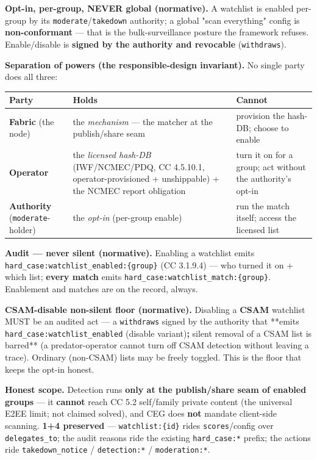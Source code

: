 \documentclass[11pt]{article}
\begin{document}
\textbf{Opt-in, per-group, NEVER global (normative).} A watchlist is enabled per-group by its \texttt{moderate}/\texttt{takedown} authority; a global "scan everything" config is \textbf{non-conformant} — that is the bulk-surveillance posture the framework refuses. Enable/disable is \textbf{signed by the authority and revocable} (\texttt{withdraws}).


\textbf{Separation of powers (the responsible-design invariant).} No single party does all three:


{\footnotesize
\begin{longtable}{|p{5.33cm}|p{5.33cm}|p{5.33cm}|}\hline
\textbf{Party} & \textbf{Holds} & \textbf{Cannot} \\ \hline\endhead
\textbf{Fabric} (the node) & the \textit{mechanism} — the matcher at the publish/share seam & provision the hash-DB; choose to enable \\ \hline
\textbf{Operator} & the \textit{licensed hash-DB} (IWF/NCMEC/PDQ, CC 4.5.10.1, operator-provisioned + unshippable) + the NCMEC report obligation & turn it on for a group; act without the authority's opt-in \\ \hline
\textbf{Authority} (\texttt{moderate}-holder) & the \textit{opt-in} (per-group enable) & run the match itself; access the licensed list \\ \hline
\end{longtable}}


\textbf{Audit — never silent (normative).} Enabling a watchlist emits \texttt{hard\_case:watchlist\_enabled:\{group\}} (CC 3.1.9.4) — who turned it on + which list; \textbf{every match} emits \texttt{hard\_case:watchlist\_match:\{group\}}. Enablement and matches are on the record, always.


\textbf{CSAM-disable non-silent floor (normative).} Disabling a \textbf{CSAM} watchlist MUST be an audited act — a \texttt{withdraws} signed by the authority that **emits \texttt{hard\_case:watchlist\_enabled} (disable variant)\textbf{; }silent removal of a CSAM list is barred** (a predator-operator cannot turn off CSAM detection without leaving a trace). Ordinary (non-CSAM) lists may be freely toggled. This is the floor that keeps the opt-in honest.


\textbf{Honest scope.} Detection runs \textbf{only at the publish/share seam of enabled groups} — it \textbf{cannot} reach CC 5.2 self/family private content (the universal E2EE limit; not claimed solved), and CEG does \textbf{not} mandate client-side scanning. \textbf{1+4 preserved} — \texttt{watchlist:\{id\}} rides \texttt{scores}/config over \texttt{delegates\_to}; the audit reasons ride the existing \texttt{hard\_case:*} prefix; the actions ride \texttt{takedown\_notice} / \texttt{detection:*} / \texttt{moderation:*}.
\end{document}
